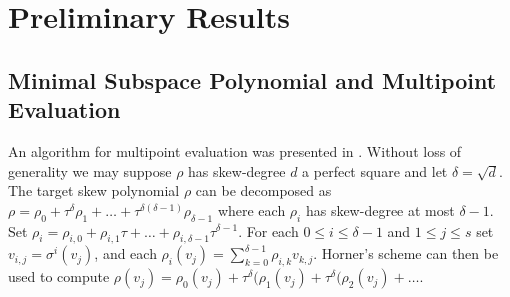 
\chapter{Preliminary Results} \label{ch-1}

\section{Minimal Subspace Polynomial and Multipoint Evaluation}

An algorithm for multipoint evaluation was presented in \cite{musschost}. Without loss of generality we may suppose $\rho$ has skew-degree $d$ a perfect square and let $\delta = \sqrt{d}$. The target skew polynomial $\rho$ can be decomposed as $\rho = \rho_0 + \tau^{\delta} \rho_1 + \ldots + \tau^{\delta(\delta - 1)}\rho_{\delta-1}$ where each $\rho_i$ has skew-degree at most $\delta - 1$. Set $\rho_i = \rho_{i,0} + \rho_{i,1}\tau + \ldots + \rho_{i,\delta - 1} \tau^{\delta-1}$. For each $0 \leq i \leq \delta -1$ and $1 \leq j \leq s$ set $v_{i,j} = \sigma^i(v_j)$, and each $\rho_i(v_j) = \sum_{k=0}^{\delta - 1} \rho_{i,k}v_{k,j}$. Horner's scheme can then be used to compute $\rho(v_j) = \rho_0(v_j) + \tau^{\delta}(\rho_1(v_j) + \tau^{\delta}(\rho_2(v_j) + \ldots $.

